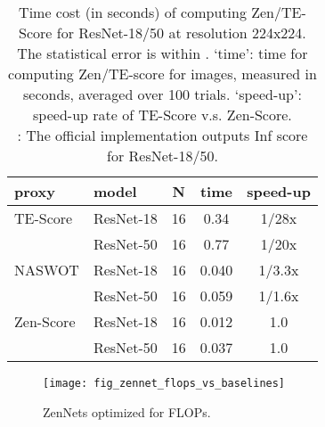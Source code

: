 \documentclass{article}
\providecommand{\tabularnewline}{\\}
\providecommand{\tabularnewline}{\\}
\begin{document}
\begin{table}[!]
 \begin{center}
 \begin{tabular}{llccc}
 \toprule 
 proxy & model & N & time & speed-up\tabularnewline
 \midrule
 \midrule 
 TE-Score & ResNet-18 & 16 & 0.34 & 1/28x \tabularnewline
 \midrule 
  & ResNet-50 & 16 & 0.77 & 1/20x \tabularnewline
 \midrule 
 NASWOT & ResNet-18 & 16 & 0.040 & 1/3.3x \tabularnewline
 \midrule 
  & ResNet-50 & 16 & 0.059 & 1/1.6x \tabularnewline
 \midrule 
 Zen-Score & ResNet-18 & 16 & 0.012 & 1.0 \tabularnewline
 \midrule 
  & ResNet-50 & 16 & 0.037 & 1.0 \tabularnewline
 \bottomrule
 \end{tabular}
 \end{center}
 \caption{Time cost (in seconds) of computing Zen/TE-Score for ResNet-18/50 at resolution 224x224. The statistical error is within . `time': time for computing Zen/TE-score for  images, measured in seconds, averaged over 100 trials. `speed-up': speed-up rate of TE-Score v.s. Zen-Score.\\
 : The official implementation outputs Inf score for ResNet-18/50.}
 \label{tab:time-cost-zen-vs-TE}
\end{table}

\begin{figure}[!]
 \begin{center}
   \texttt{[image: fig\_zennet\_flops\_vs\_baselines]}
   \caption{ZenNets optimized for FLOPs.}
   \label{fig:zennet-flops-vs-top1-acc}
 \end{center}
\end{figure}
\end{document}
